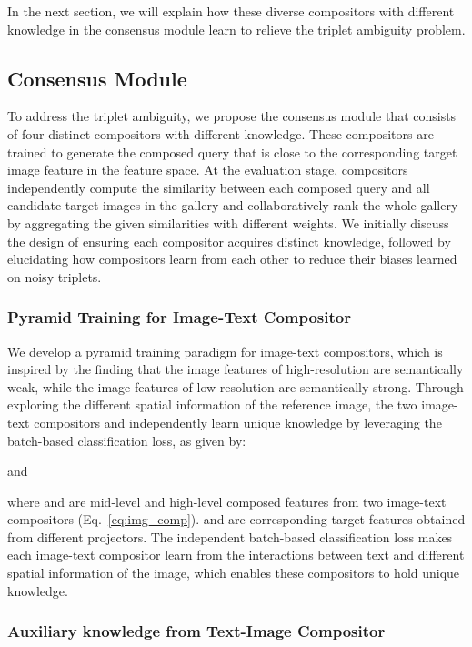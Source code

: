 \documentclass[sigconf]{acmart}
\begin{document}
In the next section, we will explain how these diverse compositors with different knowledge in the consensus module learn to relieve the triplet ambiguity problem.

\subsection{Consensus Module}
\label{subsec:consensus}

To address the triplet ambiguity, we propose the consensus module that consists of four distinct compositors with different knowledge. These compositors are trained to generate the composed query  that is close to the corresponding target image feature  in the feature space. At the evaluation stage, compositors independently compute the similarity between each composed query and all candidate target images in the gallery and collaboratively rank the whole gallery by aggregating the given similarities with different weights. We initially discuss the design of ensuring each compositor acquires distinct knowledge, followed by elucidating how compositors learn from each other to reduce their biases learned on noisy triplets.

\subsubsection{Pyramid Training for Image-Text Compositor}\label{subsubsec:pyramid}

We develop a pyramid training paradigm for image-text compositors, which is inspired by the finding \cite{lin2017feature,miech2021thinking} that the image features of high-resolution are semantically weak, while the image features of low-resolution are semantically strong. Through exploring the different spatial information of the reference image, the two image-text compositors  and  independently learn unique knowledge by leveraging the batch-based classification loss, as given by:


and

where  and  are mid-level and high-level composed features from two image-text compositors (Eq.~\ref{eq:img_comp}).  and  are corresponding target features obtained from different projectors. The independent batch-based classification loss makes each image-text compositor learn from the interactions between text and different spatial information of the image, which enables these compositors to hold unique knowledge. 

\subsubsection{Auxiliary knowledge from Text-Image Compositor}
\end{document}
